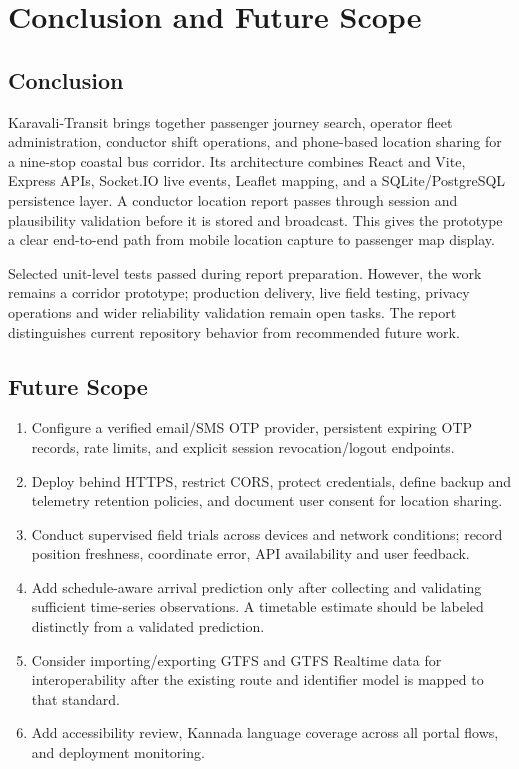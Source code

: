 \documentclass[12pt,a4paper]{report}
\begin{document}
\chapter{Conclusion and Future Scope}
\section{Conclusion}
Karavali-Transit brings together passenger journey search, operator fleet administration, conductor shift operations, and phone-based location sharing for a nine-stop coastal bus corridor. Its architecture combines React and Vite, Express APIs, Socket.IO live events, Leaflet mapping, and a SQLite/PostgreSQL persistence layer. A conductor location report passes through session and plausibility validation before it is stored and broadcast. This gives the prototype a clear end-to-end path from mobile location capture to passenger map display.

Selected unit-level tests passed during report preparation. However, the work remains a corridor prototype; production delivery, live field testing, privacy operations and wider reliability validation remain open tasks. The report distinguishes current repository behavior from recommended future work.

\section{Future Scope}
\begin{enumerate}
\item Configure a verified email/SMS OTP provider, persistent expiring OTP records, rate limits, and explicit session revocation/logout endpoints.
\item Deploy behind HTTPS, restrict CORS, protect credentials, define backup and telemetry retention policies, and document user consent for location sharing.
\item Conduct supervised field trials across devices and network conditions; record position freshness, coordinate error, API availability and user feedback.
\item Add schedule-aware arrival prediction only after collecting and validating sufficient time-series observations. A timetable estimate should be labeled distinctly from a validated prediction.
\item Consider importing/exporting GTFS and GTFS Realtime data for interoperability after the existing route and identifier model is mapped to that standard.
\item Add accessibility review, Kannada language coverage across all portal flows, and deployment monitoring.
\end{enumerate}

\clearpage\renewcommand{\bibname}{REFERENCES}


\end{document}
